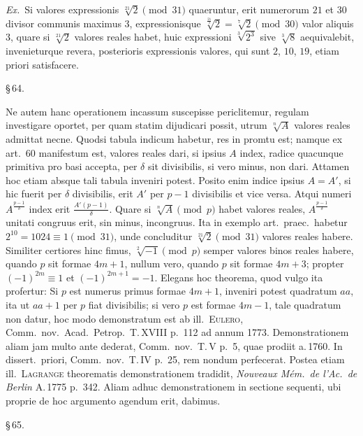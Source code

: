 \documentclass[12pt,a4paper]{article}
\theoremstyle{plain}
\theoremstyle{definition}
\theoremstyle{remark}
\begin{document}
\textit{Ex.}\ Si valores expressionis $\sqrt[21]{2} \pmod{31}$ quaeruntur, erit numerorum $21$ et $30$ divisor communis maximus $3$, expressionisque $\sqrt[\frac{21}{3}]{2} = \sqrt[7]{2} \pmod{30}$ valor aliquis $3$, quare si $\sqrt[21]{2}$ valores reales habet, huic expressioni $\sqrt[3]{2^3}$ sive $\sqrt[3]{8}$ aequivalebit, invenieturque revera, posterioris expressionis valores, qui sunt $2$, $10$, $19$, etiam priori satisfacere.

\begin{center}\S\,64.\end{center}

Ne autem hanc operationem incassum suscepisse periclitemur, regulam investigare oportet, per quam statim dijudicari possit, utrum $\sqrt[n]{A}$ valores reales admittat necne. Quodsi tabula indicum habetur, res in promtu est; namque ex art.~60 manifestum est, valores reales dari, si ipsius $A$ index, radice quacunque primitiva pro basi accepta, per $\delta$ sit divisibilis, si vero minus, non dari. Attamen hoc etiam absque tali tabula inveniri potest. Posito enim indice ipsius $A = A'$, si hic fuerit per $\delta$ divisibilis, erit $A'$ per $p-1$ divisibilis et vice versa. Atqui numeri $A^{\frac{p-1}{\delta}}$ index erit $\frac{A'(p-1)}{\delta}$. Quare si $\sqrt[n]{A} \pmod{p}$ habet valores reales, $A^{\frac{p-1}{\delta}}$ unitati congruus erit, sin minus, incongruus. Ita in exemplo art.\ praec.\ habetur $2^{10} = 1024 \equiv 1 \pmod{31}$, unde concluditur $\sqrt[21]{2} \pmod{31}$ valores reales habere. Similiter certiores hinc fimus, $\sqrt[2]{-1} \pmod{p}$ semper valores binos reales habere, quando $p$ sit formae $4m+1$, nullum vero, quando $p$ sit formae $4m+3$; propter $(-1)^{2m} \equiv 1$ et $(-1)^{2m+1} = -1$. Elegans hoc theorema, quod vulgo ita profertur: Si $p$ est numerus primus formae $4m+1$, inveniri potest quadratum $aa$, ita ut $aa+1$ per $p$ fiat divisibilis; si vero $p$ est formae $4m-1$, tale quadratum non datur, hoc modo demonstratum est ab ill.\ \textsc{Eulero}, Comm.\ nov.\ Acad.\ Petrop.\ T.\,XVIII p.~112 ad annum 1773. Demonstrationem aliam jam multo ante dederat, Comm.\ nov.\ T.\,V p.~5, quae prodiit a.\,1760. In dissert.\ priori, Comm.\ nov.\ T.\,IV p.~25, rem nondum perfecerat. Postea etiam ill.\ \textsc{Lagrange} theorematis demonstrationem tradidit, \emph{Nouveaux M\'em.\ de l'Ac.\ de Berlin} A.\,1775 p.~342. Aliam adhuc demonstrationem in sectione sequenti, ubi proprie de hoc argumento agendum erit, dabimus.

\begin{center}\S\,65.\end{center}
\end{document}
